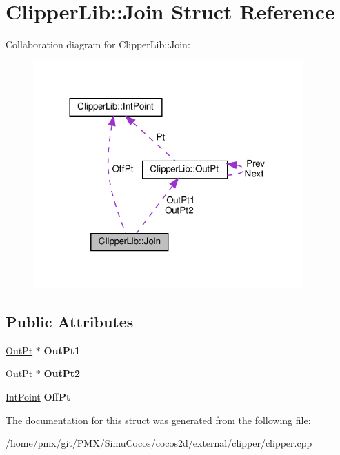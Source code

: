 \hypertarget{structClipperLib_1_1Join}{}\section{Clipper\+Lib\+:\+:Join Struct Reference}
\label{structClipperLib_1_1Join}


Collaboration diagram for Clipper\+Lib\+:\+:Join\+:
\nopagebreak
\begin{figure}[H]
\begin{center}
\leavevmode
\includegraphics[width=293pt]{structClipperLib_1_1Join__coll__graph}
\end{center}
\end{figure}
\subsection*{Public Attributes}
\begin{DoxyCompactItemize}
\item 
\mbox{\label{structClipperLib_1_1Join_a8402d6c4f9b8156f96927000eae7e400}} 
\hyperlink{structClipperLib_1_1OutPt}{Out\+Pt} $\ast$ {\bfseries Out\+Pt1}
\item 
\mbox{\label{structClipperLib_1_1Join_a85fe1ba3e2ed90e6c3426b4f8958d79a}} 
\hyperlink{structClipperLib_1_1OutPt}{Out\+Pt} $\ast$ {\bfseries Out\+Pt2}
\item 
\mbox{\label{structClipperLib_1_1Join_afa70561700d774cd762d125f9866327f}} 
\hyperlink{structClipperLib_1_1IntPoint}{Int\+Point} {\bfseries Off\+Pt}
\end{DoxyCompactItemize}


The documentation for this struct was generated from the following file\+:\begin{DoxyCompactItemize}
\item 
/home/pmx/git/\+P\+M\+X/\+Simu\+Cocos/cocos2d/external/clipper/clipper.\+cpp\end{DoxyCompactItemize}
